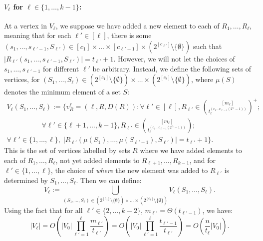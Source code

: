 \documentclass{article}
\renewcommand{\>}{\rangle}
\newcommand{\<}{\langle}
\renewcommand{\(}{\left(}
\renewcommand{\)}{\right)}
\def\abs#1{\left| #1 \right|}
\begin{document}
\paragraph{$V_{\ell}$ for $\ell\in\{1,\dots,k-1\}$:} At a vertex in $V_{\ell}$, we suppose we have added a new element to each of $R_1,\dots,R_{\ell}$, meaning that for each $\ell'\in[\ell]$, there is some $(s_1,\dots,s_{\ell'-1},S_{\ell'})\in [c_1]\times\dots\times [c_{\ell'-1}]\times (2^{[c_{\ell'}]}\setminus\{\emptyset\})$ such that $|R_{\ell'}(s_1,\dots,s_{\ell'-1},S_{\ell'})|=t_{\ell'}+1$. However, we will not let the choices of $s_1,\dots,s_{\ell'-1}$ for different $\ell'$ be arbitrary. Instead, we define the following sets of vertices, for $(S_1,\dots,S_{\ell})\in (2^{[c_1]}\setminus\{\emptyset\})\times\dots\times(2^{[c_\ell]}\setminus\{\emptyset\})$, where $\mu(S)$ denotes the minimum element of a set $S$:
\begin{multline}
\!\!V_{\ell}(S_1,\dots,S_{\ell}) := \Big\{ v^{\ell}_{R}=(\ell,R,D(R)):
\forall \ell'\in [\ell], R_{\ell'}\in\binom{[m_{\ell}]}{t_\ell^{(c_1\dots c_{\ell-1}(2^{c_{\ell}}-1))}}^+\!;\\
\qquad\qquad\quad\forall \ell'\in\{\ell+1,\dots,k-1\}, R_{\ell'}\in\binom{[m_{\ell}]}{t_\ell^{(c_1\dots c_{\ell-1}(2^{c_{\ell}}-1))}};\\
\forall \ell'\in\{1,\dots,\ell\},\; |R_{\ell'}(\mu(S_1),\dots,\mu(S_{\ell'-1}),S_{\ell'})|=t_{\ell'}+1
\Big\}.\label{eq:V-ell-Ss}
\end{multline}
This is the set of vertices labelled by sets $R$ where we have added elements to each of $R_1,\dots,R_{\ell}$, not yet added elements to $R_{\ell+1},\dots,R_{k-1}$, and for $\ell'\in\{1,\dots,\ell\}$, the choice of \emph{where} the new element was added to $R_{\ell'}$ is determined by $S_1,\dots,S_{\ell}$. 
Then we can define:
\begin{equation}
V_{\ell} := \bigcup_{(S_1,\dots,S_{\ell})\in (2^{[c_1]}\setminus\{\emptyset\})\times\dots\times(2^{[c_\ell]}\setminus\{\emptyset\})} V_{\ell}(S_1,\dots,S_{\ell}).\label{eq:V-ell-union}
\end{equation}
Using the fact that for all $\ell'\in\{2,\dots,k-2\}$, $m_{\ell'}=\Theta(t_{\ell'-1})$, we have:
\begin{equation}
\abs{V_{\ell}} = O\left(\abs{V_0} \prod_{\ell'=1}^{\ell}\frac{m_{\ell'}}{t_{\ell'}} \right)=O\left(\abs{V_0} \prod_{\ell'=1}^{\ell}\frac{t_{\ell'-1}}{t_{\ell'}} \right)=O\left(\frac{n}{t_{\ell}}\abs{V_0} \right).\label{eq:kVk0}
\end{equation}
\end{document}
